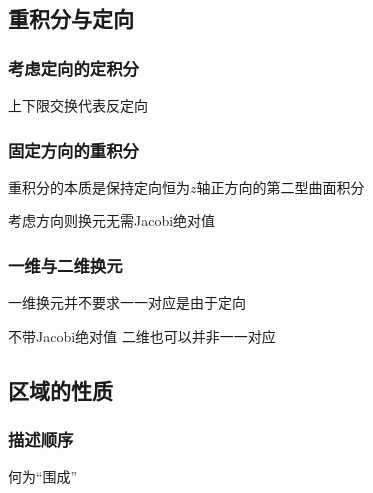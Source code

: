 \documentclass[a4paper,UTF8,fontset=windows,AutoFakeBold]{ctexart}
\theoremstyle{ex}
\begin{document}
\subsection{重积分与定向}
\subsubsection{考虑定向的定积分}
上下限交换代表反定向

\subsubsection{固定方向的重积分}
重积分的本质是保持定向恒为$z$轴正方向的第二型曲面积分

考虑方向则换元无需Jacobi绝对值

\subsubsection{一维与二维换元}
一维换元并不要求一一对应是由于定向

不带Jacobi绝对值 二维也可以并非一一对应

\subsection{区域的性质}
\subsubsection{描述顺序}
何为``围成''
\end{document}
